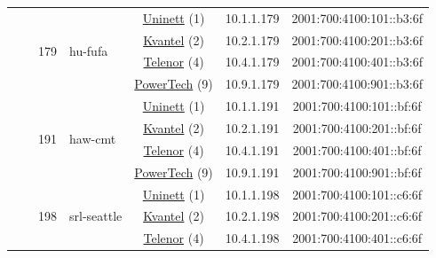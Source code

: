 \begin{small}
\begin{center}
\begin{longtable}{|c|c|c|c|c|c|c|c|}
  &  & \multirow{4}{*}{\tiny{179}} & \multicolumn{1}{|l|}{\multirow{4}{*}{\tiny{hu-fufa}}} & \multicolumn{2}{|c|}{\tiny{\href{https://www.uninett.no}{Uninett} (1)}} & \tiny{10.1.1.179} & \tiny{2001:700:4100:101::b3:6f} \\* \cline{5-5}\cline{6-6}\cline{7-7}\cline{8-8}
  &  &  &  & \multicolumn{2}{|c|}{\tiny{\href{http://kvantel.no}{Kvantel} (2)}} & \tiny{10.2.1.179} & \tiny{2001:700:4100:201::b3:6f} \\* \cline{5-5}\cline{6-6}\cline{7-7}\cline{8-8}
  &  &  &  & \multicolumn{2}{|c|}{\tiny{\href{https://www.telenor.no}{Telenor} (4)}} & \tiny{10.4.1.179} & \tiny{2001:700:4100:401::b3:6f} \\* \cline{5-5}\cline{6-6}\cline{7-7}\cline{8-8}
  &  &  &  & \multicolumn{2}{|c|}{\tiny{\href{http://www.powertech.no}{PowerTech} (9)}} & \tiny{10.9.1.179} & \tiny{2001:700:4100:901::b3:6f} \\* \cline{3-3}\cline{4-4}\cline{5-5}\cline{6-6}\cline{7-7}\cline{8-8}
  &  & \multirow{4}{*}{\tiny{191}} & \multicolumn{1}{|l|}{\multirow{4}{*}{\tiny{haw-cmt}}} & \multicolumn{2}{|c|}{\tiny{\href{https://www.uninett.no}{Uninett} (1)}} & \tiny{10.1.1.191} & \tiny{2001:700:4100:101::bf:6f} \\* \cline{5-5}\cline{6-6}\cline{7-7}\cline{8-8}
  &  &  &  & \multicolumn{2}{|c|}{\tiny{\href{http://kvantel.no}{Kvantel} (2)}} & \tiny{10.2.1.191} & \tiny{2001:700:4100:201::bf:6f} \\* \cline{5-5}\cline{6-6}\cline{7-7}\cline{8-8}
  &  &  &  & \multicolumn{2}{|c|}{\tiny{\href{https://www.telenor.no}{Telenor} (4)}} & \tiny{10.4.1.191} & \tiny{2001:700:4100:401::bf:6f} \\* \cline{5-5}\cline{6-6}\cline{7-7}\cline{8-8}
  &  &  &  & \multicolumn{2}{|c|}{\tiny{\href{http://www.powertech.no}{PowerTech} (9)}} & \tiny{10.9.1.191} & \tiny{2001:700:4100:901::bf:6f} \\* \cline{3-3}\cline{4-4}\cline{5-5}\cline{6-6}\cline{7-7}\cline{8-8}
  &  & \multirow{4}{*}{\tiny{198}} & \multicolumn{1}{|l|}{\multirow{4}{*}{\tiny{srl-seattle}}} & \multicolumn{2}{|c|}{\tiny{\href{https://www.uninett.no}{Uninett} (1)}} & \tiny{10.1.1.198} & \tiny{2001:700:4100:101::c6:6f} \\* \cline{5-5}\cline{6-6}\cline{7-7}\cline{8-8}
  &  &  &  & \multicolumn{2}{|c|}{\tiny{\href{http://kvantel.no}{Kvantel} (2)}} & \tiny{10.2.1.198} & \tiny{2001:700:4100:201::c6:6f} \\* \cline{5-5}\cline{6-6}\cline{7-7}\cline{8-8}
  &  &  &  & \multicolumn{2}{|c|}{\tiny{\href{https://www.telenor.no}{Telenor} (4)}} & \tiny{10.4.1.198} & \tiny{2001:700:4100:401::c6:6f} \\* \cline{5-5}\cline{6-6}\cline{7-7}\cline{8-8}

\end{longtable}
\end{center}
\end{small}
